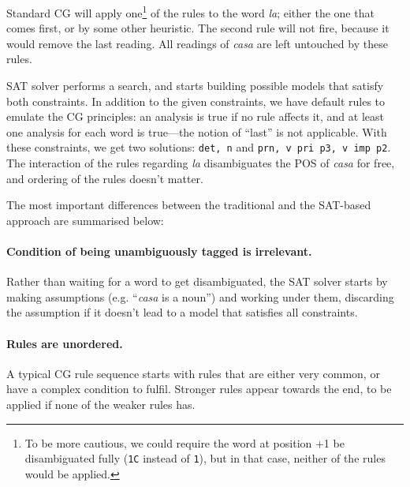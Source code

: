 \documentclass[11pt]{article}
\begin{document}
Standard CG will apply one\footnote{To be more cautious, we could require the word at position +1 be disambiguated fully (\texttt{1C} instead of \texttt{1}), but in that case, 
neither of the rules would be applied.} of the rules to the word \emph{la}; 
either the one that comes first, or by some other heuristic. 
The second rule will not fire, because it would remove the last reading. 
All readings of \emph{casa} are left untouched by these rules.

SAT solver 
performs a search, 
and starts building possible models that satisfy both constraints. 
In addition to the given constraints, we have default rules to emulate
the CG principles: an analysis is true if no rule affects it,
and at least one analysis for each word is true---the notion of ``last'' is not applicable.
With these constraints, we get two solutions: \texttt{det, n} and \texttt{prn, v pri p3, v imp p2}. 
The interaction of the rules regarding \emph{la}  disambiguates the POS of \emph{casa} 
for free, and ordering of the rules doesn't matter. 


The most important differences between the traditional and the SAT-based approach are summarised below:

\paragraph{Condition of being unambiguously tagged is irrelevant.}
Rather than waiting for a word to get disambiguated, the SAT solver starts by 
making assumptions (e.g. ``\emph{casa} is a noun'') and working under them,
discarding the assumption if it doesn't lead to a model that satisfies all constraints.

\paragraph{Rules are unordered.}
A typical CG rule sequence starts with rules that are either very common, or have a complex condition to fulfil.
Stronger rules appear towards the end, to be applied if none of the weaker rules has. 
\end{document}
